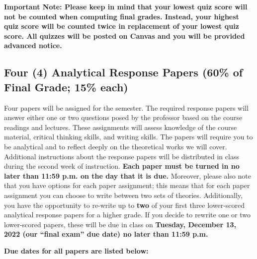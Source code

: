 \documentclass[11pt,]{article}
\begin{document}
\textbf{Important Note: Please keep in mind that your lowest quiz score
will not be counted when computing final grades. Instead, your highest
quiz score will be counted twice in replacement of your lowest quiz
score. All quizzes will be posted on Canvas and you will be provided
advanced notice.}

\hypertarget{writing_assignments}{%
\subsection{Four (4) Analytical Response Papers (60\% of Final Grade;
15\% each)}\label{writing_assignments}}

Four papers will be assigned for the semester. The required response
papers will answer either one or two questions posed by the professor
based on the course readings and lectures. These assignments will assess
knowledge of the course material, critical thinking skills, and writing
skills. The papers will require you to be analytical and to reflect
deeply on the theoretical works we will cover. Additional instructions
about the response papers will be distributed in class during the second
week of instruction. \textbf{Each paper must be turned in no later than
11:59 p.m. on the day that it is due.} Moreover, please also note that
you have options for each paper assignment; this means that for each
paper assignment you can choose to write between two sets of theories.
Additionally, you have the opportunity to re-write up to \textbf{two} of
your first three lower-scored analytical response papers for a higher
grade. If you decide to rewrite one or two lower-scored papers, these
will be due in class on \textbf{Tuesday, December 13, 2022 (our ``final
exam'' due date) no later than 11:59 p.m.}

\textbf{Due dates for all papers are listed below:}

\renewcommand{\arraystretch}{1.25}
\end{document}
